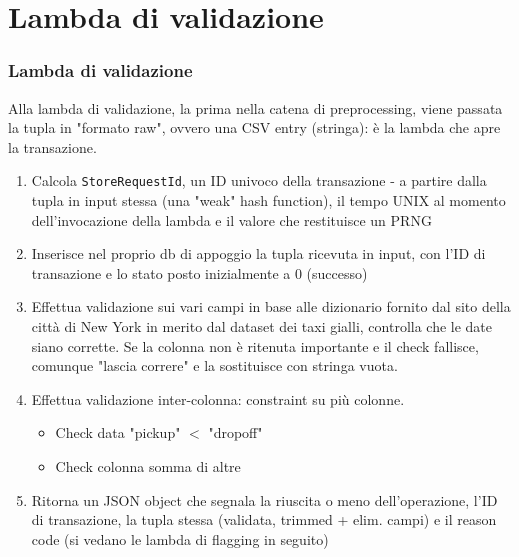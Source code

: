\documentclass{beamer}
\begin{document}
\section{Lambda di validazione}
\begin{frame}
    \frametitle{Lambda di validazione}

    \fontsize{10pt}{10pt}\selectfont

    Alla lambda di validazione, la prima nella catena di preprocessing, viene passata la tupla in "formato raw",
    ovvero una CSV entry (stringa): è la lambda che apre la transazione.

    \begin{enumerate}
        \item Calcola \texttt{StoreRequestId}, un ID univoco della transazione - a partire dalla tupla in input
        stessa (una "weak" hash function), il tempo UNIX al momento dell'invocazione della lambda e il valore 
        che restituisce un PRNG
        \item Inserisce nel proprio db di appoggio la tupla ricevuta in input, con l'ID di transazione e lo stato
        posto inizialmente a 0 (successo)
        \item Effettua validazione sui vari campi in base alle dizionario fornito dal sito della città di New York
        in merito dal dataset dei taxi gialli, controlla che le date siano corrette. Se la colonna non è ritenuta
        importante e il check fallisce, comunque "lascia correre" e la sostituisce con stringa vuota.
        \item Effettua validazione inter-colonna: constraint su più colonne.
        \begin{itemize}
            \item Check data "pickup" $<$ "dropoff"
            \item Check colonna somma di altre
        \end{itemize}
        \item Ritorna un JSON object che segnala la riuscita o meno dell'operazione, l'ID di transazione, la tupla 
        stessa (validata, trimmed + elim. campi) e il reason code (si vedano le lambda di flagging in seguito)
    \end{enumerate}
\end{frame}
\end{document}

